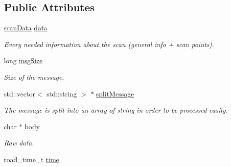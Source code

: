 \subsection*{Public Attributes}
\begin{DoxyCompactItemize}
\item 
\hypertarget{classpacpus_1_1MessageLMS_a5448754297046a46de36a32e8500f93e}{\hyperlink{structpacpus_1_1__scanData}{scan\-Data} \hyperlink{classpacpus_1_1MessageLMS_a5448754297046a46de36a32e8500f93e}{data}}\label{classpacpus_1_1MessageLMS_a5448754297046a46de36a32e8500f93e}

\begin{DoxyCompactList}\small\item\em Every needed information about the scan (general info + scan points). \end{DoxyCompactList}\item 
\hypertarget{classpacpus_1_1MessageLMS_a6b8f1da7a50fae0c3d1b4adeec39eff7}{long \hyperlink{classpacpus_1_1MessageLMS_a6b8f1da7a50fae0c3d1b4adeec39eff7}{msg\-Size}}\label{classpacpus_1_1MessageLMS_a6b8f1da7a50fae0c3d1b4adeec39eff7}

\begin{DoxyCompactList}\small\item\em Size of the message. \end{DoxyCompactList}\item 
\hypertarget{classpacpus_1_1MessageLMS_a7570d407b4cdac7450adde9448b231ae}{std\-::vector$<$ std\-::string $>$ $\ast$ \hyperlink{classpacpus_1_1MessageLMS_a7570d407b4cdac7450adde9448b231ae}{split\-Message}}\label{classpacpus_1_1MessageLMS_a7570d407b4cdac7450adde9448b231ae}

\begin{DoxyCompactList}\small\item\em The message is split into an array of string in order to be processed easily. \end{DoxyCompactList}\item 
\hypertarget{classpacpus_1_1MessageLMS_a87494c8ed7daece40f1456a0b028990a}{char $\ast$ \hyperlink{classpacpus_1_1MessageLMS_a87494c8ed7daece40f1456a0b028990a}{body}}\label{classpacpus_1_1MessageLMS_a87494c8ed7daece40f1456a0b028990a}

\begin{DoxyCompactList}\small\item\em Raw data. \end{DoxyCompactList}\item 
\hypertarget{classpacpus_1_1MessageLMS_a3b81e17d0f28e13933e50337dcf5e45b}{road\-\_\-time\-\_\-t \hyperlink{classpacpus_1_1MessageLMS_a3b81e17d0f28e13933e50337dcf5e45b}{time}}\label{classpacpus_1_1MessageLMS_a3b81e17d0f28e13933e50337dcf5e45b}


\end{DoxyCompactItemize}
